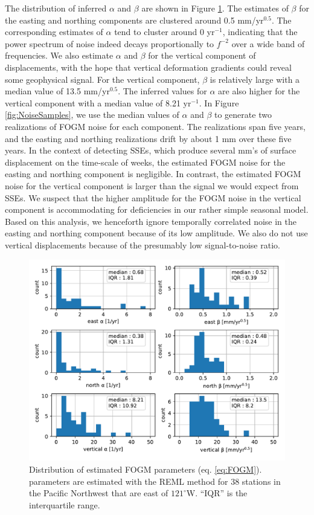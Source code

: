 \documentclass[extra,mreferee]{gji}
\begin{document}
The distribution of inferred $\alpha$ and $\beta$ are shown in Figure
\ref{fig:NoiseParams}. The estimates of $\beta$ for the easting and
northing components are clustered around 0.5 mm/yr$^{0.5}$. The
corresponding estimates of $\alpha$ tend to cluster around 0
yr$^{-1}$, indicating that the power spectrum of noise indeed decays
proportionally to $f^{-2}$ over a wide band of frequencies. We also
estimate $\alpha$ and $\beta$ for the vertical component of
displacements, with the hope that vertical deformation gradients could
reveal some geophysical signal. For the vertical component, $\beta$ is
relatively large with a median value of 13.5 mm/yr$^{0.5}$. The
inferred values for $\alpha$ are also higher for the vertical
component with a median value of 8.21 yr$^{-1}$. In Figure
\ref{fig:NoiseSamples}, we use the median values of $\alpha$ and
$\beta$ to generate two realizations of FOGM noise for each component.
The realizations span five years, and the easting and northing
realizations drift by about 1 mm over these five years. In the context
of detecting SSEs, which produce several mm's of surface displacement
on the time-scale of weeks, the estimated FOGM noise for the easting
and northing component is negligible. In contrast, the estimated FOGM
noise for the vertical component is larger than the signal we would
expect from SSEs. We suspect that the higher amplitude for the FOGM
noise in the vertical component is accommodating for deficiencies in
our rather simple seasonal model. Based on this analysis, we
henceforth ignore temporally correlated noise in the easting and
northing component because of its low amplitude. We also do not use
vertical displacements because of the presumably low signal-to-noise
ratio.

\begin{figure}
\includegraphics{figures/noise/noise-params.pdf}
\caption{
Distribution of estimated FOGM parameters (eq. \ref{eq:FOGM}).
parameters are estimated with the REML method for 38 stations in
the Pacific Northwest that are east of $121^\circ$W. ``IQR'' is the
interquartile range.
}   
\label{fig:NoiseParams}
\end{figure}
\end{document}
